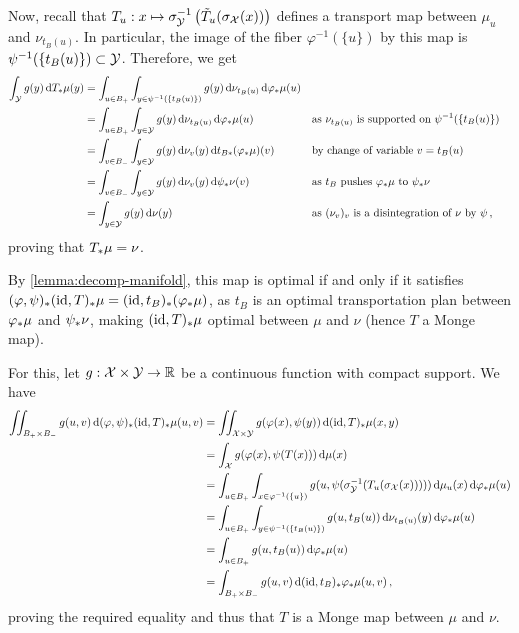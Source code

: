 Now, recall that $T_u : x \mapsto \sigma_{\mathcal{Y}}^{-1}\left(\tilde{T}_u(\sigma_{\mathcal{X}}(x))\right)$ defines a transport map between $\mu_u$ and $\nu_{t_B(u)}$. In particular, the image of the fiber $\varphi^{-1}(\{u\})$ by this map is $\psi^{-1}(\{t_B(u)\}) \subset \mathcal{Y}$.
Therefore, we get
\begin{align*}
    \int_{\mathcal{Y}} g(y) \,\mathrm d T_* \mu(y) &= \int_{u \in B_+} \int_{y \in \psi^{-1}(\{t_B(u)\})} g(y) \,\mathrm d \nu_{t_B(u)} \,\mathrm d \varphi_*\mu(u) \\
    &= \int_{u \in B_+} \int_{y \in \mathcal{Y}} g(y) \,\mathrm d \nu_{t_B(u)} \,\mathrm d \varphi_*\mu(u) & & \text{as $\nu_{t_B(u)}$ is supported on $\psi^{-1}(\{t_B(u)\})$} \\
    &= \int_{v \in B_-} \int_{y \in \mathcal{Y}} g(y) \,\mathrm d \nu_{v}(y) \,\mathrm d t_{B*} (\varphi_*\mu)(v) & & \text{by change of variable $v = t_B(u)$} \\
    &= \int_{v \in B_-} \int_{y \in \mathcal{Y}} g(y) \,\mathrm d \nu_{v}(y) \,\mathrm d \psi_*\nu(v) & & \text{as $t_B$ pushes $\varphi_*\mu$ to $\psi_*\nu$}\\
    &= \int_{y \in \mathcal{Y}} g(y) \,\mathrm d \nu(y) & & \text{as $(\nu_v)_v$ is a disintegration of $\nu$ by $\psi$}\,,
\end{align*}
proving that $T _* \mu = \nu$.

By \cref{lemma:decomp-manifold}, this map is optimal if and only if it satisfies $(\varphi,\psi)_*(\operatorname{id},T)_* \mu = (\operatorname{id}, t_B)_*(\varphi_*\mu)$, as  $t_B$ is an optimal transportation plan between $\varphi_*\mu$ and $\psi_*\nu$, making $(\operatorname{id},T)_*\mu$ optimal between $\mu$ and $\nu$ (hence $T$ a Monge map).

For this, let $g : \mathcal{X} \times \mathcal{Y} \to \mathbb{R}$ be a continuous function with compact support. We have
\begin{align*}
    \iint_{B_+ \times B_-} g(u,v) \,\mathrm d (\varphi,\psi)_*(\operatorname{id},T)_* \mu(u,v) &= \iint_{\mathcal{X} \times \mathcal{Y}} g(\varphi(x),\psi(y)) \,\mathrm d (\operatorname{id},T)_*\mu(x,y) \\
    &= \int_{\mathcal{X}} g(\varphi(x),\psi(T(x))) \,\mathrm d \mu(x) \\
    &= \int_{u \in B_+} \int_{x \in \varphi^{-1}(\{u\})} g(u, \psi(\sigma_{\mathcal{Y}}^{-1}(T_u(\sigma_{\mathcal{X}}(x))))) \,\mathrm d \mu_u(x) \,\mathrm d \varphi _* \mu(u) \\
    &= \int_{u \in B_+} \int_{y \in \psi^{-1}(\{t_B(u)\})} g(u, t_B(u)) \,\mathrm d \nu_{t_B(u)}(y) \,\mathrm d \varphi _* \mu(u) \\
    &= \int_{u \in B_+} g(u, t_B(u)) \,\mathrm d \varphi_*\mu(u) \\
    &= \int_{B_+ \times B_-} g(u,v) \,\mathrm d (\operatorname{id},t_B)_* \varphi _*\mu(u,v)\,,
\end{align*}
proving the required equality and thus that $T$ is a Monge map between $\mu$ and $\nu$.

